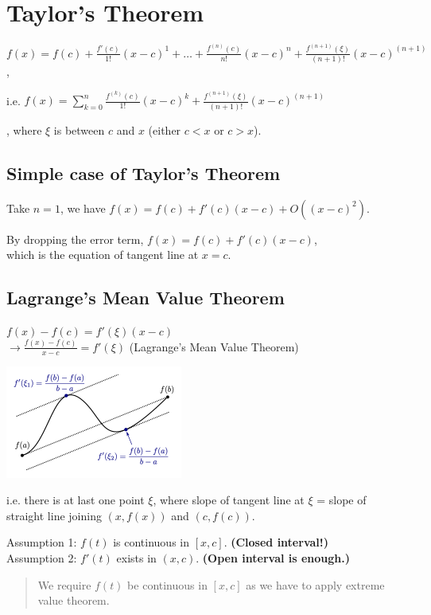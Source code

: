 \section{Taylor's Theorem}

$ f(x) = f(c) + \frac{f'(c)}{1!} (x-c)^1 + \dots + \frac{f^{(n)}(c)}{n!}(x-c)^n + \frac{f^{(n+1)}(\xi)}{(n+1)!}(x-c)^{(n+1)} $,

i.e. $f(x) = \sum_{k=0}^n \frac{f^{(k)}(c)}{1!} (x-c)^k + \frac{f^{(n+1)}(\xi)}{(n+1)!}(x-c)^{(n+1)} $

, where $\xi$ is between $c$ and $x$ (either $c < x$ or $c > x$).

\subsection{Simple case of Taylor's Theorem}

Take $n = 1$, we have
$f(x) = f(c) + f'(c) (x - c) + O((x - c)^2)$.

By dropping the error term,
$f(x) = f(c) + f'(c) (x - c)$,\\
which is the equation of tangent line at $x = c$.

\subsection{Lagrange's Mean Value Theorem}

$ f(x) - f(c) = f'(\xi)(x-c) $\\
$\rightarrow \frac{f(x)-f(c)}{x-c} = f'(\xi)$ (Lagrange's Mean Value Theorem)

\includegraphics{MVT.png}

i.e. there is at last one point $\xi$, where slope of tangent line at $\xi$ = slope of straight line joining $(x, f(x))$ and $(c, f(c)) $.

Assumption 1: $f(t)$ is continuous in $[x, c]$. \textbf{(Closed interval!)}\\
Assumption 2: $f'(t)$ exists in $(x, c)$. \textbf{(Open interval is enough.)}

\begin{quote}
    We require $f(t)$ be continuous in $[x, c]$ as we have to apply extreme value theorem.
\end{quote}

